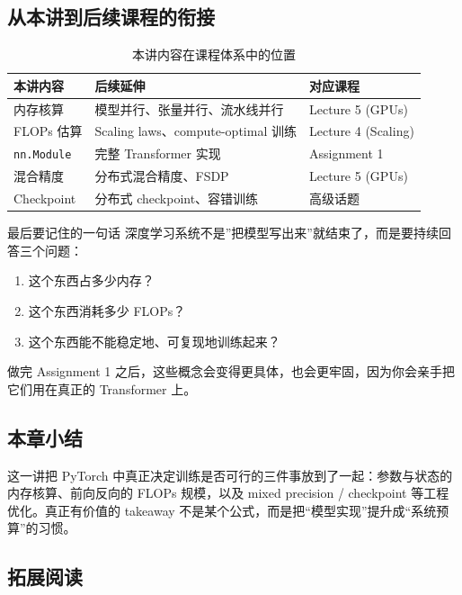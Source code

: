 \subsection{从本讲到后续课程的衔接}

\begin{table}[H]
\centering
\begin{tabular}{p{}p{}p{}}
\toprule
\textbf{本讲内容} & \textbf{后续延伸} & \textbf{对应课程} \\
\midrule
内存核算 & 模型并行、张量并行、流水线并行 & Lecture 5 (GPUs) \\
FLOPs 估算 & Scaling laws、compute-optimal 训练 & Lecture 4 (Scaling) \\
\texttt{nn.Module} & 完整 Transformer 实现 & Assignment 1 \\
混合精度 & 分布式混合精度、FSDP & Lecture 5 (GPUs) \\
Checkpoint & 分布式 checkpoint、容错训练 & 高级话题 \\
\bottomrule
\end{tabular}
\caption{本讲内容在课程体系中的位置}
\end{table}

\begin{importantbox}{最后要记住的一句话}
深度学习系统不是”把模型写出来”就结束了，而是要持续回答三个问题：
\begin{enumerate}
    \item 这个东西占多少内存？
    \item 这个东西消耗多少 FLOPs？
    \item 这个东西能不能稳定地、可复现地训练起来？
\end{enumerate}
\end{importantbox}

做完 Assignment 1 之后，这些概念会变得更具体，也会更牢固，因为你会亲手把它们用在真正的 Transformer 上。

\subsection{本章小结}
这一讲把 PyTorch 中真正决定训练是否可行的三件事放到了一起：参数与状态的内存核算、前向反向的 FLOPs 规模，以及 mixed precision / checkpoint 等工程优化。真正有价值的 takeaway 不是某个公式，而是把“模型实现”提升成“系统预算”的习惯。

\subsection{拓展阅读}

